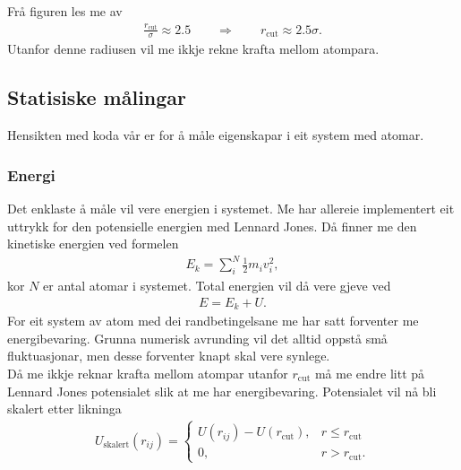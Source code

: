 \documentclass[12pt, a4paper]{article}
\theoremstyle{definition}
\begin{document}
            Frå figuren les me av 
            \begin{align*}
                \frac{r_{\text{cut}}}{\sigma} \approx 2.5 \qquad \Rightarrow \qquad r_{\text{cut}} \approx 2.5\sigma.
            \end{align*}
            Utanfor denne radiusen vil me ikkje rekne krafta mellom atompara.


    \newpage

    \subsection*{Statisiske målingar}
        Hensikten med koda vår er for å måle eigenskapar i eit system med atomar.

        \subsubsection*{Energi}
            Det enklaste å måle vil vere energien i systemet. Me har allereie implementert eit uttrykk for den potensielle energien med Lennard Jones. Då finner me
            den kinetiske energien ved formelen
            \begin{align*}
                E_{k} = \sum_{i}^N\frac{1}{2}m_iv_{i}^2,
            \end{align*}
            kor $N$ er antal atomar i systemet. Total energien vil då vere gjeve ved
            \begin{align*}
                E = E_{k} + U.
            \end{align*}
            For eit system av atom med dei randbetingelsane me har satt forventer me energibevaring. Grunna numerisk avrunding vil det alltid oppstå små fluktuasjonar,
            men desse forventer knapt skal vere synlege. \\

            Då me ikkje reknar krafta mellom atompar utanfor $r_{\text{cut}}$ må me endre litt på Lennard Jones potensialet slik at me har energibevaring. 
            Potensialet vil nå bli skalert etter likninga
            \begin{align*}
                U_{\text{skalert}}(r_{ij}) = 
                \begin{cases}
                    U(r_{ij}) - U(r_{\text{cut}}), & r \leq r_{\text{cut}} \\
                    0, & r > r_{\text{cut}}.
                \end{cases}
            \end{align*}
\end{document}
